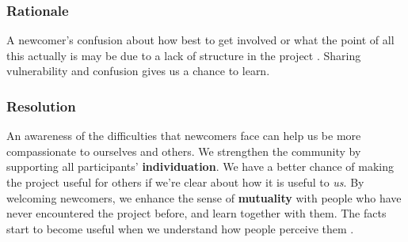 \subsubsection*{Rationale} 
%
A newcomer's confusion about how best to get involved or what the
point of all this actually is may be due to a lack of structure in the
project .  Sharing vulnerability and confusion
gives us a chance to learn.
%

\subsubsection*{Resolution}
An awareness of the difficulties that newcomers face can help us be
more compassionate to ourselves and others.  We strengthen the
community by supporting all participants' \textbf{individuation}.  We
have a better chance of making the project useful for others if we're
clear about how it is useful to \emph{us}.  By welcoming newcomers, we
enhance the sense of \textbf{mutuality} with people who have never
encountered the project before, and learn together with them.  The
facts start to become useful when we understand how people perceive
them \cite{freire1982creating}.


